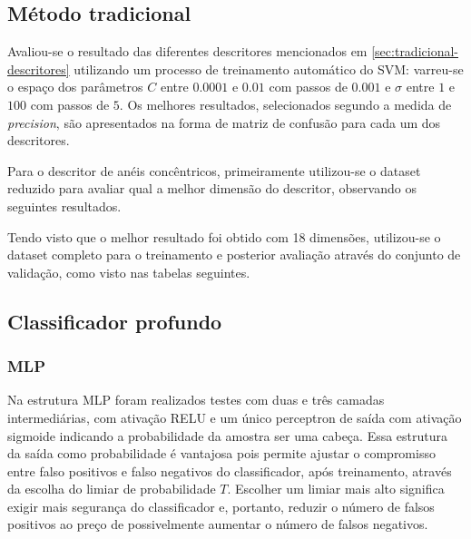 \subsection{Método tradicional}
Avaliou-se o resultado das diferentes descritores mencionados em \ref{sec:tradicional-descritores} utilizando um processo de treinamento automático do SVM: varreu-se o espaço dos parâmetros $C$ entre $0.0001$ e $0.01$ com passos de $0.001$ e $\sigma$ entre $1$ e $100$ com passos de $5$. Os melhores resultados, selecionados segundo a medida de \textit{precision}, são apresentados na forma de matriz de confusão para cada um dos descritores.

\begin{table}[h]
\end{table}

Para o descritor de anéis concêntricos, primeiramente utilizou-se o dataset reduzido para avaliar qual a melhor dimensão do descritor, observando os seguintes resultados.

\begin{table}[h!]
\end{table}

Tendo visto que o melhor resultado foi obtido com 18 dimensões, utilizou-se o dataset completo para o treinamento e posterior avaliação através do conjunto de validação, como visto nas tabelas seguintes.

\begin{table}[h!]
\end{table}


\subsection{Classificador profundo}

\subsubsection{MLP}
Na estrutura MLP foram realizados testes com duas e três camadas intermediárias, com ativação RELU e um único perceptron de saída com ativação sigmoide indicando a probabilidade da amostra ser uma cabeça. Essa estrutura da saída como probabilidade é vantajosa pois permite ajustar o compromisso entre falso positivos e falso negativos do classificador, após treinamento, através da escolha do limiar de probabilidade $T$. Escolher um limiar mais alto significa exigir mais segurança do classificador e, portanto, reduzir o número de falsos positivos ao preço de possivelmente aumentar o número de falsos negativos.


